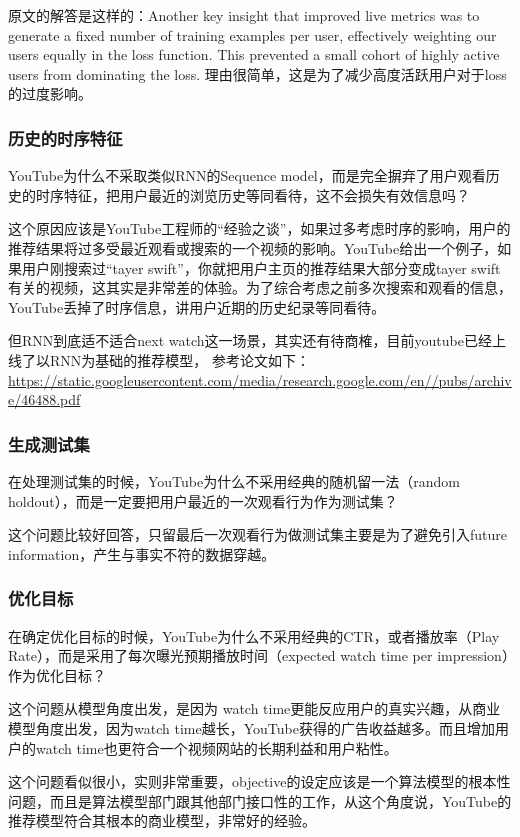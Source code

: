\documentclass[12pt]{article}
\begin{document}
原文的解答是这样的：Another key insight that improved live metrics was to generate a fixed number of training examples per user, effectively weighting our users equally in the loss function. This prevented a small cohort of highly active users from dominating the loss. 理由很简单，这是为了减少高度活跃用户对于loss的过度影响。

\subsubsection{历史的时序特征}
YouTube为什么不采取类似RNN的Sequence model，而是完全摒弃了用户观看历史的时序特征，把用户最近的浏览历史等同看待，这不会损失有效信息吗？

这个原因应该是YouTube工程师的“经验之谈”，如果过多考虑时序的影响，用户的推荐结果将过多受最近观看或搜索的一个视频的影响。YouTube给出一个例子，如果用户刚搜索过“tayer swift”，你就把用户主页的推荐结果大部分变成tayer swift有关的视频，这其实是非常差的体验。为了综合考虑之前多次搜索和观看的信息，YouTube丢掉了时序信息，讲用户近期的历史纪录等同看待。

但RNN到底适不适合next watch这一场景，其实还有待商榷，目前youtube已经上线了以RNN为基础的推荐模型， 参考论文如下： \url{https://static.googleusercontent.com/media/research.google.com/en//pubs/archive/46488.pdf}

\subsubsection{生成测试集}
在处理测试集的时候，YouTube为什么不采用经典的随机留一法（random holdout），而是一定要把用户最近的一次观看行为作为测试集？

这个问题比较好回答，只留最后一次观看行为做测试集主要是为了避免引入future information，产生与事实不符的数据穿越。

\subsubsection{优化目标}
在确定优化目标的时候，YouTube为什么不采用经典的CTR，或者播放率（Play Rate），而是采用了每次曝光预期播放时间（expected watch time per impression）作为优化目标？

这个问题从模型角度出发，是因为 watch time更能反应用户的真实兴趣，从商业模型角度出发，因为watch time越长，YouTube获得的广告收益越多。而且增加用户的watch time也更符合一个视频网站的长期利益和用户粘性。

这个问题看似很小，实则非常重要，objective的设定应该是一个算法模型的根本性问题，而且是算法模型部门跟其他部门接口性的工作，从这个角度说，YouTube的推荐模型符合其根本的商业模型，非常好的经验。
\end{document}
